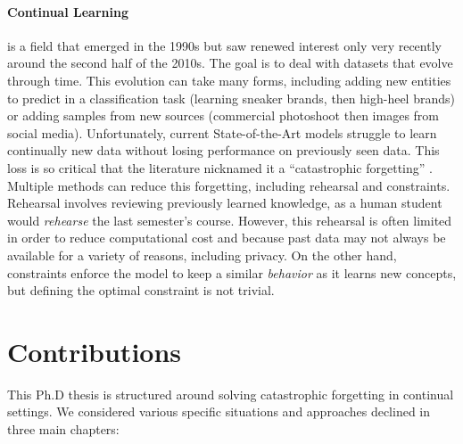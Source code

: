 \paragraph{Continual Learning} is a field that emerged in the 1990s but saw renewed interest only
very recently around the second half of the 2010s. The goal is to deal with datasets that evolve
through time. This evolution can take many forms, including adding new entities to predict in a
classification task (\eg learning sneaker brands, then high-heel brands) or adding samples from new
sources (\eg commercial photoshoot then images from social media). Unfortunately, current
State-of-the-Art models struggle to learn continually new data without losing performance on
previously seen data. This loss is so critical that the literature nicknamed it a ``catastrophic
forgetting'' \citep{robins1995catastrophicforgetting}. Multiple methods can reduce
this forgetting, including rehearsal and constraints. Rehearsal involves reviewing
previously learned knowledge, as a human student would \textit{rehearse} the last semester's course.
However, this rehearsal is often limited in order to reduce computational cost and because past data
may not always be available for a variety of reasons, including privacy. On the other hand,
constraints enforce the model to keep a similar \textit{behavior} as it learns new concepts, but
defining the optimal constraint is not trivial.

\section{Contributions}

This Ph.D thesis is structured around solving catastrophic forgetting in continual settings. We
considered various specific situations and approaches declined in three main chapters:

